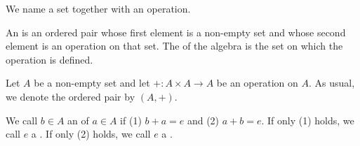 
\sbasic





\sstart
{}


We name a set
together with an operation.



An  is
an ordered pair whose first
element is a non-empty set
and whose second element
is an operation on that set.
The
of the algebra is
the set on which the operation
is defined.


Let $A$ be a non-empty set and
let $+: A \times A \to A$ be
an operation on $A$.
As usual, we denote the ordered
pair by $(A, +)$.




We call $b \in A$ an 
of $a \in A$ if (1) $b + a = e$ and (2) $a + b = e$.
If only (1) holds, we call $e$ a
.
If only (2) holds, we call $e$ a
.

\strats
